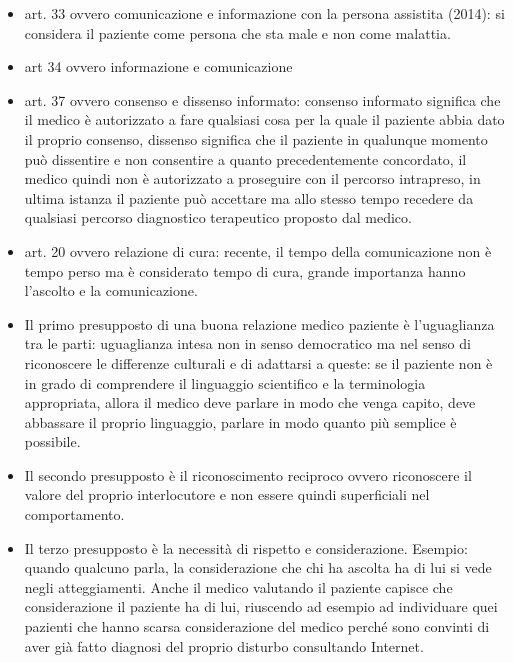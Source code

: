 \documentclass[]{article}
\begin{document}
\begin{itemize}
\item
  art. 33 ovvero comunicazione e informazione con la persona assistita
  (2014): si considera il paziente come persona che sta male e non come
  malattia.
\item
  art 34 ovvero informazione e comunicazione
\item
  art. 37 ovvero consenso e dissenso informato: consenso informato
  significa che il medico è autorizzato a fare qualsiasi cosa per la
  quale il paziente abbia dato il proprio consenso, dissenso significa
  che il paziente in qualunque momento può dissentire e non consentire a
  quanto precedentemente concordato, il medico quindi non è autorizzato
  a proseguire con il percorso intrapreso, in ultima istanza il paziente
  può accettare ma allo stesso tempo recedere da qualsiasi percorso
  diagnostico terapeutico proposto dal medico.
\item
  art. 20 ovvero relazione di cura: recente, il tempo della
  comunicazione non è tempo perso ma è considerato tempo di cura, grande
  importanza hanno l'ascolto e la comunicazione.
\end{itemize}

\begin{itemize}
\item
  Il primo presupposto di una buona relazione medico paziente è
  l'uguaglianza tra le parti: uguaglianza intesa non in senso
  democratico ma nel senso di riconoscere le differenze culturali e di
  adattarsi a queste: se il paziente non è in grado di comprendere il
  linguaggio scientifico e la terminologia appropriata, allora il medico
  deve parlare in modo che venga capito, deve abbassare il proprio
  linguaggio, parlare in modo quanto più semplice è possibile.
\item
  Il secondo presupposto è il riconoscimento reciproco ovvero
  riconoscere il valore del proprio interlocutore e non essere quindi
  superficiali nel comportamento.
\item
  Il terzo presupposto è la necessità di rispetto e considerazione.
  Esempio: quando qualcuno parla, la considerazione che chi ha ascolta
  ha di lui si vede negli atteggiamenti. Anche il medico valutando il
  paziente capisce che considerazione il paziente ha di lui, riuscendo
  ad esempio ad individuare quei pazienti che hanno scarsa
  considerazione del medico perché sono convinti di aver già fatto
  diagnosi del proprio disturbo consultando Internet.
\end{itemize}
\end{document}
